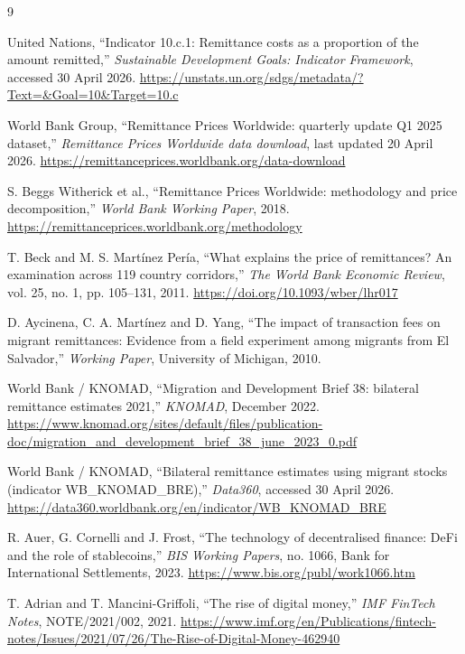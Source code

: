 \documentclass[
  11pt,
]{article}
\begin{document}
\renewcommand{\refname}{}\vspace{-3em}
\begin{thebibliography}{9}

United Nations,
``Indicator 10.c.1: Remittance costs as a proportion of the amount remitted,''
\emph{Sustainable Development Goals: Indicator Framework}, accessed 30 April 2026.
\url{https://unstats.un.org/sdgs/metadata/?Text=&Goal=10&Target=10.c}

World Bank Group,
``Remittance Prices Worldwide: quarterly update Q1 2025 dataset,''
\emph{Remittance Prices Worldwide data download}, last updated 20 April 2026.
\url{https://remittanceprices.worldbank.org/data-download}

S. Beggs Witherick et al.,
``Remittance Prices Worldwide: methodology and price decomposition,''
\emph{World Bank Working Paper}, 2018.
\url{https://remittanceprices.worldbank.org/methodology}

T. Beck and M. S. Mart\'inez Per\'ia,
``What explains the price of remittances? An examination across 119 country corridors,''
\emph{The World Bank Economic Review}, vol. 25, no. 1, pp. 105--131, 2011.
\url{https://doi.org/10.1093/wber/lhr017}

D. Aycinena, C. A. Mart\'inez and D. Yang,
``The impact of transaction fees on migrant remittances: Evidence from a field experiment among migrants from El Salvador,''
\emph{Working Paper}, University of Michigan, 2010.

World Bank / KNOMAD,
``Migration and Development Brief 38: bilateral remittance estimates 2021,''
\emph{KNOMAD}, December 2022.
\url{https://www.knomad.org/sites/default/files/publication-doc/migration_and_development_brief_38_june_2023_0.pdf}

World Bank / KNOMAD,
``Bilateral remittance estimates using migrant stocks (indicator WB\_KNOMAD\_BRE),''
\emph{Data360}, accessed 30 April 2026.
\url{https://data360.worldbank.org/en/indicator/WB_KNOMAD_BRE}

R. Auer, G. Cornelli and J. Frost,
``The technology of decentralised finance: DeFi and the role of stablecoins,''
\emph{BIS Working Papers}, no. 1066, Bank for International Settlements, 2023.
\url{https://www.bis.org/publ/work1066.htm}

T. Adrian and T. Mancini-Griffoli,
``The rise of digital money,''
\emph{IMF FinTech Notes}, NOTE/2021/002, 2021.
\url{https://www.imf.org/en/Publications/fintech-notes/Issues/2021/07/26/The-Rise-of-Digital-Money-462940}


\end{thebibliography}
\end{document}
